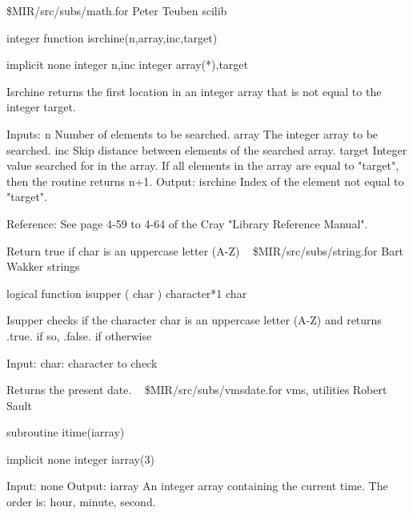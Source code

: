 \newline {} \$MIR/src/subs/math.for
\newline {} Peter Teuben
\newline {} scilib
\par{\tenpoint
{\eightpoint\begintt
        integer function isrchine(n,array,inc,target)

        implicit none
        integer n,inc
        integer array(*),target

  Isrchine returns the first location in an integer array that is not equal
  to the integer target.

  Inputs:
    n          Number of elements to be searched.
    array      The integer array to be searched.
    inc        Skip distance between elements of the searched array.
    target     Integer value searched for in the array. If all elements
               in the array are equal to "target", then the routine
               returns n+1.
  Output:
    isrchine   Index of the element not equal to "target".

  Reference:
  See page 4-59 to 4-64 of the Cray "Library Reference Manual".
\endtt}
\par}
%
\noindent Return true if char is an uppercase letter (A-Z)
\newline \ 
\newline {} \$MIR/src/subs/string.for
\newline {} Bart Wakker
\newline {} strings
\par{\tenpoint
{\eightpoint\begintt
      logical function isupper ( char )
      character*1 char

 Isupper checks if the character char is an uppercase letter (A-Z) and returns
 .true. if so, .false. if otherwise

 Input:
   char:    character to check
\endtt}
\par}
%
\noindent Returns the present date.
\newline \ 
\newline {} \$MIR/src/subs/vmsdate.for
\newline {} vms, utilities
\newline \abox{Responsible:} Robert Sault
\par{\tenpoint
{\eightpoint\begintt
      subroutine itime(iarray)

      implicit none
      integer iarray(3)

 Input:
   none
 Output:
   iarray   An integer array containing the current time.  The order
            is: hour, minute, second.
\endtt}
\par}
